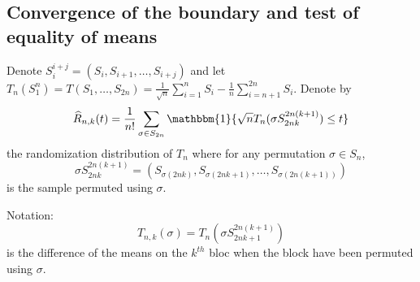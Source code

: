 \documentclass{article}
\theoremstyle{plain}
\theoremstyle{remark}
\newcommand{\1}{\mathbbm{1}}
\numberwithin{equation}{section}
\begin{document}
\subsection{Convergence of the boundary and test of equality of means}
Denote $S_{i}^{i+j}=(S_i, S_{i+1},\dots, S_{i+j})$ and let $T_n(S_1^n)=T(S_1,\dots,S_{2n})=\frac{1}{\sqrt{n}}\sum_{i=1}^n S_i -\frac{1}{n}\sum_{i=n+1}^{2n} S_i$. Denote by
$$\widehat{R}_{n,k}(t)=\frac{1}{n!}\sum_{\sigma \in S_{2n}} \1\{\sqrt{n}T_n(\sigma S_{2nk}^{2n(k+1)}) \le t\} $$
the randomization distribution of $T_n$ where for any permutation $\sigma \in S_n$,
$$\sigma S_{2nk}^{2n(k+1)}=(S_{\sigma(2nk)},S_{\sigma(2nk+1)},\dots,S_{\sigma(2n(k+1))})$$
is the sample permuted using $ \sigma$.

Notation:
$$T_{n,k}(\sigma)=T_n\left(\sigma S_{2nk+1}^{2n(k+1)}\right) $$
is the difference of the means on the $k^{th}$ bloc when the block have been permuted using $\sigma$.
\end{document}
